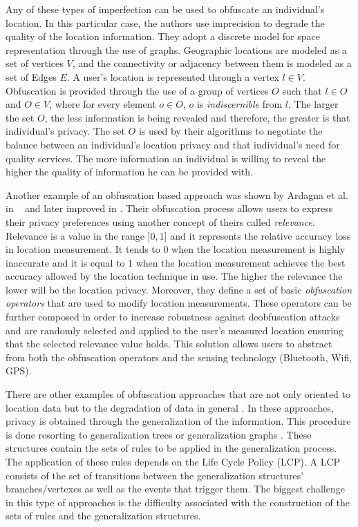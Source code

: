 Any of these types of imperfection can be used to obfuscate an
individual's location. In this particular case, the authors use
imprecision to degrade the quality of the location information.
They adopt a discrete model for space representation through the use of
graphs. Geographic locations are modeled as a set of vertices $V$, and
the connectivity or adjacency between them is modeled as a set of
Edges $E$. A user's location is represented through a
vertex $l \in V$. Obfuscation is provided through the use of a group
of vertices $O$ such that $l \in O$ and $O \in V$, where for every
element $o \in O$, $o$ is \emph{indiscernible} from $l$. The larger
the set $O$, the less information is being revealed and therefore, the
greater is that individual's privacy. The set $O$ is used by their
algorithms to negotiate the balance between an individual's location
privacy and that individual's need for quality services. The more
information an individual is willing to reveal the higher the quality
of information he can be provided with.

Another example of an obfuscation based approach was shown by
Ardagna et al. in ~\cite{ardagna2007middleware} and later improved in
\cite{ardagna2007location, ardagna2011obfuscation}. Their obfuscation
process allows users to express their privacy preferences using
another concept of theirs called \emph{relevance}. Relevance is a
value in the range $]0,1]$ and it represents the relative accuracy
loss in location measurement. It tends to 0 when the location
measurement is highly inaccurate and it is equal to 1 when the
location measurement achieves the best accuracy allowed by the
location technique in use. The higher the relevance the lower will be the
location privacy. Moreover, they define a set of basic
\emph{obfuscation operators} that are used to modify location
measurements. These operators can be further composed in order to
increase robustness against deobfuscation attacks and are
randomly selected and applied to the user's measured location ensuring
that the selected relevance value holds. This solution allows users to
abstract from both the obfuscation operators and the sensing
technology (Bluetooth, Wifi, GPS).

There are other examples of obfuscation approaches that are not only
oriented to location data but to the degradation of data in general
\cite{anciaux2008instantdb,heerde2006data}. In these approaches,
privacy is obtained through the generalization of the information.
This procedure is done resorting to generalization trees
\cite{anciaux2008instantdb} or generalization graphs
\cite{heerde2006data}. These structures contain the sets of rules to
be applied in the generalization process. The application of these
rules depends on the Life Cycle Policy (LCP). A LCP consists of the
set of transitions between the generalization structures'
branches/vertexes as well as the events that trigger them. The biggest
challenge in this type of approaches is the difficulty associated with
the construction of the sets of rules and the generalization
structures.

